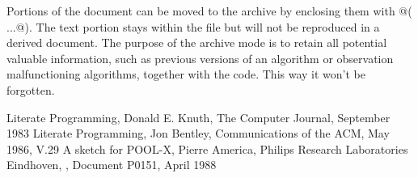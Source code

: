 Portions of the \Mx document can be moved to the archive by
enclosing them with @( ...@). The text portion stays within the 
\Mx file but will not be reproduced in a derived document.
The purpose of the archive mode is to retain all potential valuable
information, such as previous versions of an algorithm or 
observation malfunctioning algorithms, together with the code.
This way it won't be forgotten.
\begin{thebibliography}{Knuth xx}
{ Literate Programming, Donald E. Knuth, The Computer Journal, September 1983}
{ Literate Programming, Jon Bentley, Communications of the ACM, May 1986, V.29}
{ A sketch for POOL-X, Pierre America, Philips Research Laboratories Eindhoven,
, Document P0151, April 1988 }
\end{thebibliography}

